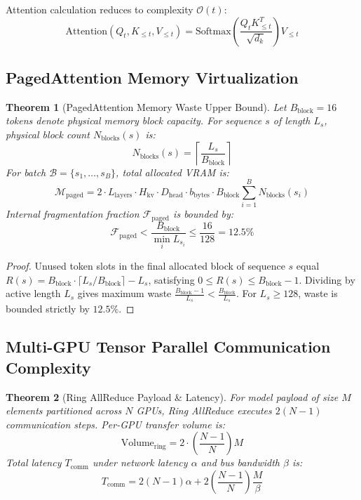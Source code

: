 \documentclass[10pt,twocolumn,a4paper]{article}
\newtheorem{theorem}{Theorem}[section]
\theoremstyle{definition}
\theoremstyle{remark}
\begin{document}
Attention calculation reduces to complexity $\mathcal{O}(t)$:
\begin{equation}
\text{Attention}(Q_t, K_{\le t}, V_{\le t}) = \text{Softmax}\left( \frac{Q_t K_{\le t}^T}{\sqrt{d_k}} \right) V_{\le t}
\end{equation}

\subsection{PagedAttention Memory Virtualization}

\begin{theorem}[PagedAttention Memory Waste Upper Bound]
Let $B_{\text{block}} = 16$ tokens denote physical memory block capacity. For sequence $s$ of length $L_s$, physical block count $N_{\text{blocks}}(s)$ is:
\begin{equation}
N_{\text{blocks}}(s) = \left\lceil \frac{L_s}{B_{\text{block}}} \right\rceil
\end{equation}
For batch $\mathcal{B} = \{s_1, \dots, s_B\}$, total allocated VRAM is:
\begin{equation}
\mathcal{M}_{\text{paged}} = 2 \cdot L_{\text{layers}} \cdot H_{\text{kv}} \cdot D_{\text{head}} \cdot b_{\text{bytes}} \cdot B_{\text{block}} \sum_{i=1}^B N_{\text{blocks}}(s_i)
\end{equation}
Internal fragmentation fraction $\mathcal{F}_{\text{paged}}$ is bounded by:
\begin{equation}
\mathcal{F}_{\text{paged}} < \frac{B_{\text{block}}}{\min_{i} L_{s_i}} \le \frac{16}{128} = 12.5\%
\end{equation}
\end{theorem}

\begin{proof}
Unused token slots in the final allocated block of sequence $s$ equal $R(s) = B_{\text{block}} \cdot \lceil L_s / B_{\text{block}} \rceil - L_s$, satisfying $0 \le R(s) \le B_{\text{block}} - 1$. Dividing by active length $L_s$ gives maximum waste $\frac{B_{\text{block}} - 1}{L_s} < \frac{B_{\text{block}}}{L_s}$. For $L_s \ge 128$, waste is bounded strictly by $12.5\%$.
\end{proof}

\subsection{Multi-GPU Tensor Parallel Communication Complexity}

\begin{theorem}[Ring AllReduce Payload \& Latency]
For model payload of size $M$ elements partitioned across $N$ GPUs, Ring AllReduce executes $2(N-1)$ communication steps. Per-GPU transfer volume is:
\begin{equation}
\text{Volume}_{\text{ring}} = 2 \cdot \left(\frac{N-1}{N}\right) M
\end{equation}
Total latency $T_{\text{comm}}$ under network latency $\alpha$ and bus bandwidth $\beta$ is:
\begin{equation}
T_{\text{comm}} = 2(N-1)\alpha + 2\left(\frac{N-1}{N}\right) \frac{M}{\beta}
\end{equation}
\end{theorem}
\end{document}
